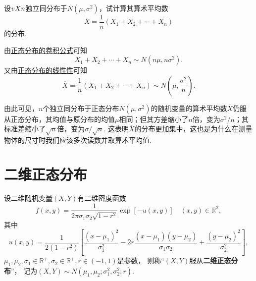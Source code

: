 \begin{example}
设\(v{X}{n}\)独立同分布于\(N(\mu,\sigma^2)\)，试计算其算术平均数\[
\overline{X} = \frac{1}{n} (X_1+X_2+\dotsb+X_n)
\]的分布.
\begin{solution}
由\hyperref[theorem:正态分布与自然指数分布族.正态分布的可加性2]{正态分布的卷积公式}可知\[
X_1+X_2+\dotsb+X_n \sim N(n\mu,n\sigma^2).
\]又由\hyperref[theorem:正态分布与自然指数分布族.正态分布的线性性质]{正态分布的线性性}可知\[
\overline{X} = \frac{1}{n} (X_1+X_2+\dotsb+X_n) \sim N\left(\mu,\frac{\sigma^2}{n}\right).
\]
\end{solution}
由此可见，\(n\)个独立同分布于正态分布\(N(\mu,\sigma^2)\)的随机变量的算术平均数\(\overline{X}\)仍服从正态分布，其均值与原分布的均值\(\mu\)相同；但其方差缩小了\(n\)倍，变为\(\sigma^2/n\)；其标准差缩小了\(\sqrt{n}\)倍，变为\(\sigma/\sqrt{n}\).
这表明\(\overline{X}\)的分布更加集中，这也是为什么在测量物体的尺寸时我们应该多次读数并取算术平均值.
\end{example}

\section{二维正态分布}
\begin{definition}
设二维随机变量\((X,Y)\)有二维密度函数
\begin{equation}
f(x,y) = \frac{1}{2\pi\sigma_1\sigma_2\sqrt{1-r^2}} \exp[- u(x,y)]
\quad(x,y)\in\mathbb{R}^2,
\end{equation}
其中\[
u(x,y)
= \frac{1}{2(1-r^2)} \left[
		\frac{(x-\mu_1)^2}{\sigma_1^2}
		-2r\frac{(x-\mu_1)(y-\mu_2)}{\sigma_1\sigma_2}
		+\frac{(y-\mu_2)^2}{\sigma_2^2}
	\right],
\]\(\mu_1,\mu_2,\sigma_1\in\mathbb{R}^+,\sigma_2\in\mathbb{R}^+,r\in(-1,1)\)是参数，%
则称“\((X,Y)\)服从\textbf{二维正态分布}”，%
记为\((X,Y) \sim N(\mu_1,\mu_2;\sigma_1^2,\sigma_2^2;r)\).
\end{definition}


